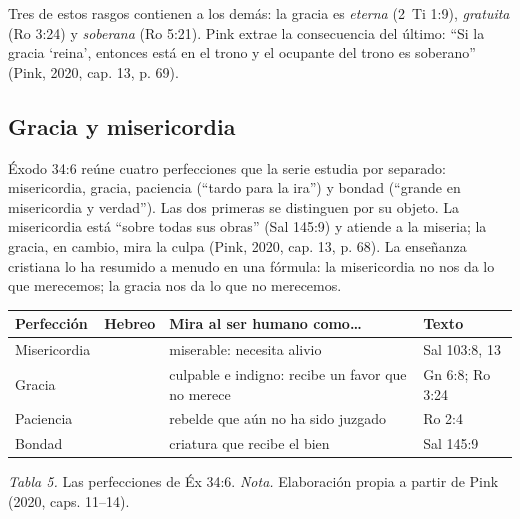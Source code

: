 Tres de estos rasgos contienen a los demás: la gracia es \emph{eterna} (2~Ti 1:9), \emph{gratuita} (Ro 3:24) y \emph{soberana} (Ro 5:21). Pink extrae la consecuencia del último: ``Si la gracia `reina', entonces está en el trono y el ocupante del trono es soberano'' (Pink, 2020, cap. 13, p. 69).

\subsection{Gracia y misericordia}
Éxodo 34:6 reúne cuatro perfecciones que la serie estudia por separado: misericordia, gracia, paciencia (``tardo para la ira'') y bondad (``grande en misericordia y verdad''). Las dos primeras se distinguen por su objeto. La misericordia está ``sobre todas sus obras'' (Sal 145:9) y atiende a la miseria; la gracia, en cambio, mira la culpa (Pink, 2020, cap. 13, p. 68). La enseñanza cristiana lo ha resumido a menudo en una fórmula: la misericordia no nos da lo que merecemos; la gracia nos da lo que no merecemos.

\begin{center}\small\renewcommand{\arraystretch}{1.2}
\begin{tabular}{@{}L{2.6cm}L{2.4cm}L{5.0cm}L{4.4cm}@{}}
\toprule
\textbf{Perfección} & \textbf{Hebreo} & \textbf{Mira al ser humano como\ldots} & \textbf{Texto} \\ \midrule
Misericordia &  & miserable: necesita alivio & Sal 103:8, 13 \\
Gracia &  & culpable e indigno: recibe un favor que no merece & Gn 6:8; Ro 3:24 \\
Paciencia &  & rebelde que aún no ha sido juzgado & Ro 2:4 \\
Bondad &  & criatura que recibe el bien & Sal 145:9 \\
\bottomrule
\end{tabular}\par
{\footnotesize\color{gris}\textit{Tabla 5.} Las perfecciones de Éx 34:6. \textit{Nota.} Elaboración propia a partir de Pink (2020, caps. 11--14).}
\end{center}


